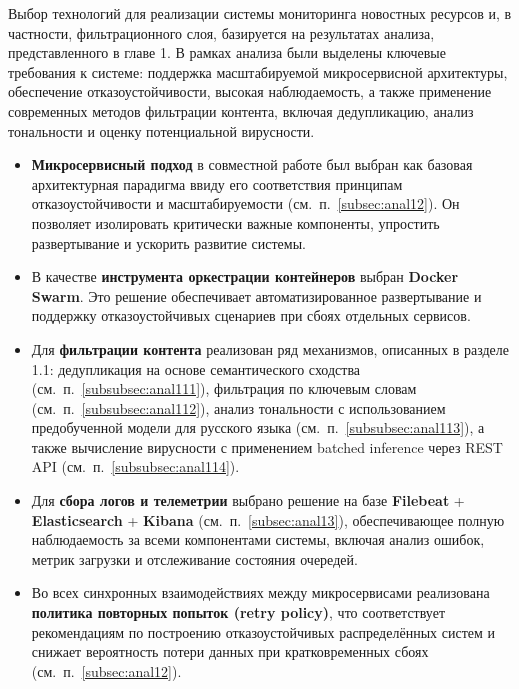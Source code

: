 \newpage


Выбор технологий для реализации системы мониторинга новостных ресурсов и, в частности, фильтрационного слоя, базируется на результатах анализа, представленного в главе 1.
В рамках анализа были выделены ключевые требования к системе: поддержка масштабируемой микросервисной архитектуры, обеспечение отказоустойчивости, высокая наблюдаемость, а также применение современных методов фильтрации контента, включая дедупликацию, анализ тональности и оценку потенциальной вирусности.
\begin{itemize}
    \item \textbf{Микросервисный подход} в совместной работе был выбран как базовая архитектурная парадигма ввиду его соответствия принципам отказоустойчивости и масштабируемости (см.\ п.~\ref{subsec:anal12}).
    Он позволяет изолировать критически важные компоненты, упростить развертывание и ускорить развитие системы.
    \item В качестве \textbf{инструмента оркестрации контейнеров} выбран \textbf{Docker Swarm}.
    Это решение обеспечивает автоматизированное развертывание и поддержку отказоустойчивых сценариев при сбоях отдельных сервисов.
    \item Для \textbf{фильтрации контента} реализован ряд механизмов, описанных в разделе 1.1: дедупликация на основе семантического сходства (см.\ п.~\ref{subsubsec:anal111}), фильтрация по ключевым словам (см.\ п.~\ref{subsubsec:anal112}), анализ тональности с использованием предобученной модели для русского языка (см.\ п.~\ref{subsubsec:anal113}), а также вычисление вирусности с применением batched inference через REST API (см.\ п.~\ref{subsubsec:anal114}).
    \item Для \textbf{сбора логов и телеметрии} выбрано решение на базе \textbf{Filebeat} + \textbf{Elasticsearch} + \textbf{Kibana} (см.\ п.~\ref{subsec:anal13}), обеспечивающее полную наблюдаемость за всеми компонентами системы, включая анализ ошибок, метрик загрузки и отслеживание состояния очередей.
    \item Во всех синхронных взаимодействиях между микросервисами реализована \textbf{политика повторных попыток (retry policy)}, что соответствует рекомендациям по построению отказоустойчивых распределённых систем и снижает вероятность потери данных при кратковременных сбоях (см.\ п.~\ref{subsec:anal12}).
\end{itemize}

